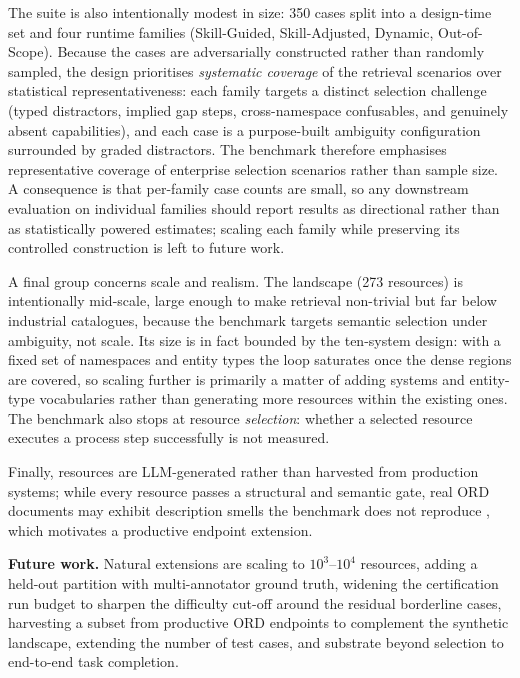 \documentclass[10pt,twocolumn]{article}
\begin{document}
The suite is also intentionally modest in size: 350 cases split into a design-time set and four runtime families (Skill-Guided, Skill-Adjusted, Dynamic, Out-of-Scope). Because the cases are adversarially constructed rather than randomly sampled, the design prioritises \emph{systematic coverage} of the retrieval scenarios over statistical representativeness: each family targets a distinct selection challenge (typed distractors, implied gap steps, cross-namespace confusables, and genuinely absent capabilities), and each case is a purpose-built ambiguity configuration surrounded by graded distractors. The benchmark therefore emphasises representative coverage of enterprise selection scenarios rather than sample size. A consequence is that per-family case counts are small, so any downstream evaluation on individual families should report results as directional rather than as statistically powered estimates; scaling each family while preserving its controlled construction is left to future work.

A final group concerns scale and realism. The landscape (273 resources) is intentionally mid-scale, large enough to make retrieval non-trivial but far below industrial catalogues, because the benchmark targets semantic selection under ambiguity, not scale. Its size is in fact bounded by the ten-system design: with a fixed set of namespaces and entity types the loop saturates once the dense regions are covered, so scaling further is primarily a matter of adding systems and entity-type vocabularies rather than generating more resources within the existing ones. The benchmark also stops at resource \emph{selection}: whether a selected resource executes a process step successfully is not measured. 

Finally, resources are LLM-generated rather than harvested from production systems; while every resource passes a structural and semantic gate, real ORD documents may exhibit description smells the benchmark does not reproduce \citep{hasan_model_2026}, which motivates a productive endpoint extension.

\textbf{Future work.} Natural extensions are scaling to $10^3$--$10^4$ resources, adding a held-out partition with multi-annotator ground truth, widening the certification run budget to sharpen the difficulty cut-off around the residual borderline cases, harvesting a subset from productive ORD endpoints to complement the synthetic landscape, extending the number of test cases, and substrate beyond selection to end-to-end task completion. 
\end{document}
